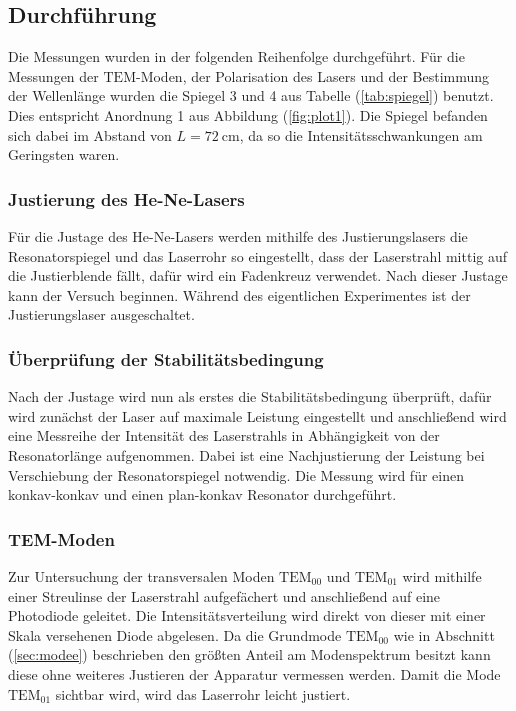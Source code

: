 \subsection{Durchführung}
\label{sec:durchff}
Die Messungen wurden in der folgenden Reihenfolge durchgeführt. Für die Messungen der $\mathrm{TEM}$-Moden, der Polarisation des Lasers und der Bestimmung der Wellenlänge wurden die Spiegel 3 und 4 aus Tabelle (\ref{tab:spiegel}) benutzt. Dies entspricht Anordnung 1 aus Abbildung (\ref{fig:plot1}).
Die Spiegel befanden sich dabei im Abstand von $L=\SI{72}{\centi\meter}$, da so die Intensitätsschwankungen am Geringsten waren.
\subsubsection{Justierung des He-Ne-Lasers}
Für die Justage des He-Ne-Lasers werden mithilfe des Justierungslasers die Resonatorspiegel und das Laserrohr so eingestellt, dass der Laserstrahl mittig auf die Justierblende fällt, dafür wird ein Fadenkreuz verwendet.
Nach dieser Justage kann der Versuch beginnen. Während des eigentlichen Experimentes ist der Justierungslaser ausgeschaltet.
\subsubsection{Überprüfung der Stabilitätsbedingung}
Nach der Justage wird nun als erstes die Stabilitätsbedingung überprüft, dafür wird zunächst der Laser auf maximale Leistung eingestellt und anschließend wird eine Messreihe der Intensität des Laserstrahls in Abhängigkeit von
der Resonatorlänge aufgenommen. Dabei ist eine Nachjustierung der Leistung bei Verschiebung der Resonatorspiegel notwendig. Die Messung wird für einen konkav-konkav und einen plan-konkav Resonator durchgeführt.
\subsubsection{TEM-Moden}
Zur Untersuchung der transversalen Moden $\mathrm{TEM}_\mathrm{00}$ und $\mathrm{TEM}_\mathrm{01}$ wird mithilfe einer Streulinse der Laserstrahl aufgefächert und anschließend auf eine Photodiode geleitet.
Die Intensitätsverteilung wird direkt von dieser mit einer Skala versehenen Diode abgelesen. Da die Grundmode $\mathrm{TEM}_\mathrm{00}$ wie in Abschnitt (\ref{sec:modee}) beschrieben den größten Anteil am Modenspektrum besitzt kann
diese ohne weiteres Justieren der Apparatur vermessen werden. Damit die Mode $\mathrm{TEM}_\mathrm{01}$ sichtbar wird, wird das Laserrohr leicht justiert.
